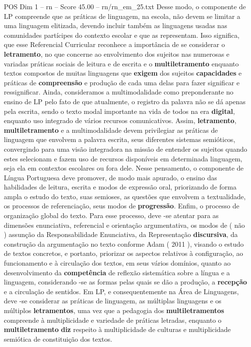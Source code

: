 \begin{textsample}{POS Dim 1 – rn – Score 45.00 – rn/rn\_em\_25.txt}
Desse modo, o componente de LP compreende que as práticas de linguagem, na escola, não devem se limitar a uma linguagem elitizada, devendo incluir também as linguagens usadas nas comunidades partícipes do contexto escolar e que as representam.
Isso significa, que esse Referencial Curricular reconhece a importância de se considerar o \textbf{letramento}, no que concerne ao envolvimento dos sujeitos nas numerosas e variadas práticas sociais de leitura e de escrita e o \textbf{multiletramento} enquanto textos compostos de muitas linguagens que \textbf{exigem} dos sujeitos \textbf{capacidades} e práticas de \textbf{compreensão} e produção de cada uma delas para fazer significar e ressignificar.
Ainda, consideramos a multimodalidade como preponderante no ensino de LP pelo fato de que atualmente, o registro da palavra não se dá apenas pela escrita, sendo o texto modal importante na vida de todos na era \textbf{digital}, enquanto uso integrado de vários recursos comunicativos.
Assim, \textbf{letramento}, \textbf{multiletramento} e a multimodalidade devem privilegiar as práticas de linguagem que envolvem a palavra escrita, seus diferentes sistemas semióticos, convergindo para uma visão integradora na missão de entender os sujeitos quando estes selecionam e fazem uso de recursos disponíveis em determinada linguagem, seja ela em contextos escolares ou fora dele.
Nesse pensamento, o componente de Língua Portuguesa deve promover, de modo mais apurado, o ensino das habilidades de leitura, escrita e modos de expressão oral, priorizando de forma ampla o estudo do texto, suas semioses, as questões que envolvem a textualidade, os processos de referenciação, seus modos de \textbf{progressão}.
Enfim, o processo de organização global do texto.
Para esse processo, deve -se atentar para as dimensões enunciativa, referencial e orientação argumentativa, os modos de ( não ) assunção da Responsabilidade Enunciativa, da Representação \textbf{discursiva}, da construção da argumentação no texto conforme Adam ( 2011 ), visando o estudo de textos concretos, e portanto, priorizar os aspectos relativos à configuração, ao funcionamento e à circulação dos textos, em seus vários domínios, quanto ao desenvolvimento da \textbf{competência} de reflexão sistemática sobre a língua e a linguagem, considerando -se as formas pelas quais se dão a produção, a \textbf{recepção} e a circulação de sentidos.
Em LP, e consequentemente na Área de Linguagens, deve -se considerar as práticas de linguagem, as múltiplas linguagens e os múltiplos \textbf{letramentos}, uma vez que a pedagogia dos \textbf{multiletramentos} compreende à multiplicidade e variedade de práticas letradas, enquanto o \textbf{multiletramento} \textbf{diz} respeito à multiplicidade de culturas e multiplicidade semiótica de constituição dos textos.

\end{textsample}
